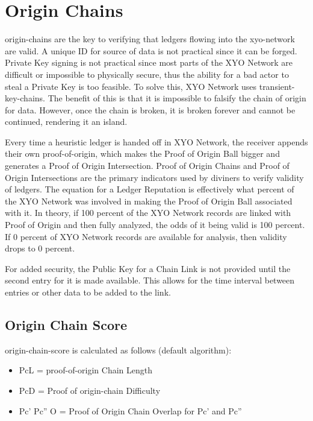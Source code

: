 \documentclass{article}
\begin{document}
\section {Origin Chains}
\Glspl{origin-chain} are the key to verifying that ledgers flowing into the \Gls{xyo-network} are valid. A unique ID for source of data is not practical since it can be forged. Private Key signing is not practical since most parts of the XYO Network are difficult or impossible to physically secure, thus the ability for a bad actor to steal a Private Key is too feasible. To solve this, XYO Network uses \Glspl{transient-key-chain}. The benefit of this is that it is impossible to falsify the chain of origin for data. However, once the chain is broken, it is broken forever and cannot be continued, rendering it an island. 

Every time a \gls{heuristic} ledger is handed off in XYO Network, the receiver appends their own \Gls{proof-of-origin}, which makes the Proof of Origin Ball bigger and generates a Proof of Origin Intersection. Proof of Origin Chains and Proof of Origin Intersections are the primary indicators used by \Glspl{diviner} to verify validity of ledgers. The equation for a Ledger Reputation is effectively what percent of the XYO Network was involved in making the Proof of Origin Ball associated with it. In theory, if 100 percent of the XYO Network records are linked with Proof of Origin and then fully analyzed, the odds of it being valid is 100 percent. If 0 percent of XYO Network records are available for analysis, then validity drops to 0 percent.

For added security, the Public Key for a Chain Link is not provided until the second entry for it is made available. This allows for the time interval between entries or other data to be added to the link.

\subsection {Origin Chain Score}
\Gls{origin-chain-score} is calculated as follows (default algorithm):

\begin{itemize}
\item PcL = \Gls{proof-of-origin} Chain Length
\item PcD = Proof of \Gls{origin-chain} Difficulty
\item Pc' Pc'' O = Proof of Origin Chain Overlap for Pc' and Pc''
\end{itemize}
\end{document}
